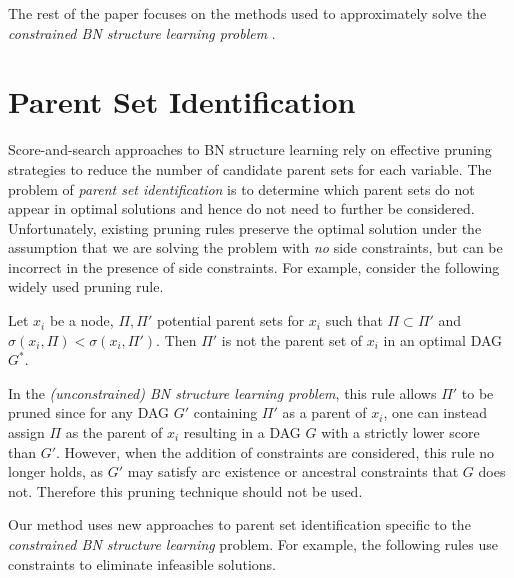 \documentclass[twoside,11pt]{article}
\begin{document}
\smallskip
The rest of the paper focuses on the methods used to approximately solve the \emph{constrained BN structure learning problem} . 


%
%
\section{Parent Set Identification}
\label{SECTION:ParentSetIdentification}

Score-and-search approaches to BN structure learning rely on effective pruning strategies to reduce the number of candidate parent sets for each
variable. The problem of \emph{parent set identification} is to determine which parent sets do not appear in optimal solutions and hence do not need to further be considered.
Unfortunately, existing pruning rules preserve the optimal solution under the assumption that we are solving the problem with \emph{no} side constraints, but can be
incorrect in the presence of side constraints. 
For example, consider the following widely used pruning rule.

\begin{lemma}

Let $x_i$ be a node, $\Pi, \Pi'$ potential parent sets for $x_i$ such that 
$\Pi \subset \Pi'$ and $\sigma(x_i, \Pi) < \sigma(x_i, \Pi')$. Then $\Pi'$ is
not the parent set of $x_i$ in an optimal DAG $G^*$. 
\end{lemma}

In the \emph{(unconstrained) BN structure learning problem}, this rule allows $\Pi'$ to be pruned since for any DAG $G'$ containing $\Pi'$ as a parent of $x_i$, 
one can instead assign $\Pi$ as the parent of $x_i$ resulting in a DAG $G$ with a strictly lower score than $G'$. However, when the addition of constraints are considered, this rule 
no longer holds, as $G'$ may satisfy arc existence or ancestral constraints that $G$ does not. Therefore this pruning technique should not be used. 

\smallskip
Our method uses new approaches to parent set identification specific to the \emph{constrained BN structure learning} problem. For example, the following rules use constraints to eliminate infeasible solutions.
\end{document}

